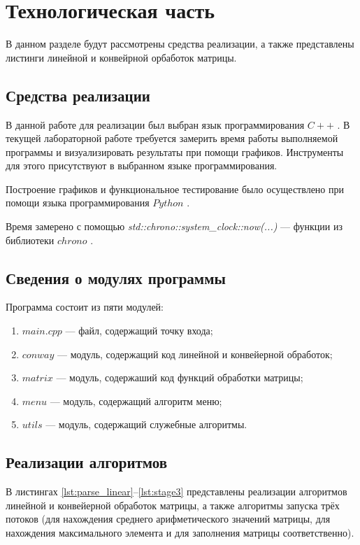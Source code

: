 \chapter{Технологическая часть}

В данном разделе будут рассмотрены средства реализации, а также представлены листинги линейной и конвейрной орбаботок матрицы.


\section{Средства реализации}
В данной работе для реализации был выбран язык программирования $C++$ \cite{cpp-lang}. В текущей лабораторной работе требуется замерить время работы выполняемой программы
и визуализировать результаты при помощи графиков. Инструменты для этого присутствуют в выбранном языке программирования.

Построение графиков и функциональное тестирование было осуществлено при помощи языка программирования $Python$ \cite{python-lang}.

Время замерено с помощью \textit{std::chrono::system\_clock::now(...)} --- функции из библиотеки $chrono$ \cite{cpp-lang-chrono}.


\section{Сведения о модулях программы}
Программа состоит из пяти модулей:
\begin{enumerate}[label=\arabic*)]
	\item $main.cpp$ --- файл, содержащий точку входа;
	\item $conway$ --- модуль, содержащий код линейной и конвейерной обработок;
	\item $matrix$ --- модуль, содержаший код функций обработки матрицы;
	\item $menu$ --- модуль, содержащий алгоритм меню;
	\item $utils$ --- модуль, содержащий служебные алгоритмы. 
\end{enumerate}


\section{Реализации алгоритмов}

В листингах \ref{lst:parse_linear}--\ref{lst:stage3} представлены реализации алгоритмов линейной и конвейерной обработок матрицы, а также алгоритмы запуска трёх потоков (для нахождения среднего арифметического значений матрицы, для нахождения максимального элемента и для заполнения матрицы соответственно).

